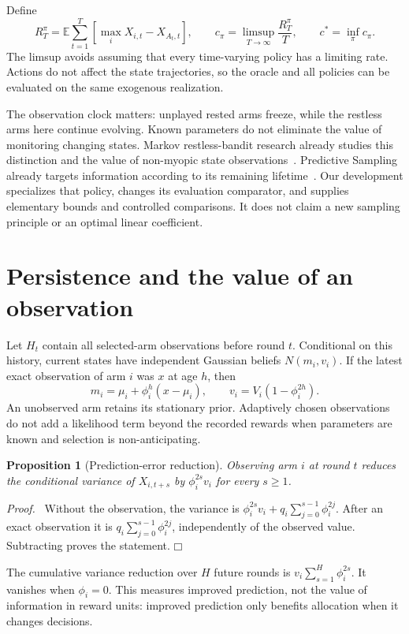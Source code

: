 \documentclass[11pt]{article}
\newtheorem{proposition}{Proposition}
\newenvironment{proof}{\par\noindent\textit{Proof.}\ }{\hfill$\mdlgwhtsquare$\par\medskip}
\newcommand{\E}{\mathbb E}
\begin{document}
Define
\begin{equation}
R_T^\pi=\E\sum_{t=1}^T[\max_iX_{i,t}-X_{A_t,t}],\qquad
c_\pi=\limsup_{T\to\infty}\frac{R_T^\pi}{T},\qquad
c^*=\inf_\pi c_\pi.
\end{equation}
The limsup avoids assuming that every time-varying policy has a limiting rate. Actions do not affect the state trajectories, so the oracle and all policies can be evaluated on the same exogenous realization.

The observation clock matters: unplayed rested arms freeze, while the restless arms here continue evolving. Known parameters do not eliminate the value of monitoring changing states. Markov restless-bandit research already studies this distinction and the value of non-myopic state observations~\cite{ortner2014}. Predictive Sampling already targets information according to its remaining lifetime~\cite{liu2023}. Our development specializes that policy, changes its evaluation comparator, and supplies elementary bounds and controlled comparisons. It does not claim a new sampling principle or an optimal linear coefficient.

\section{Persistence and the value of an observation}
Let $H_t$ contain all selected-arm observations before round $t$. Conditional on this history, current states have independent Gaussian beliefs $N(m_i,v_i)$. If the latest exact observation of arm $i$ was $x$ at age $h$, then
\begin{equation}
m_i=\mu_i+\phi_i^h(x-\mu_i),\qquad
v_i=V_i(1-\phi_i^{2h}).
\label{eq:belief}
\end{equation}
An unobserved arm retains its stationary prior. Adaptively chosen observations do not add a likelihood term beyond the recorded rewards when parameters are known and selection is non-anticipating.

\begin{proposition}[Prediction-error reduction]
Observing arm $i$ at round $t$ reduces the conditional variance of $X_{i,t+s}$ by $\phi_i^{2s}v_i$ for every $s\geq1$.
\end{proposition}
\begin{proof}
Without the observation, the variance is
$\phi_i^{2s}v_i+q_i\sum_{j=0}^{s-1}\phi_i^{2j}$.
After an exact observation it is $q_i\sum_{j=0}^{s-1}\phi_i^{2j}$, independently of the observed value. Subtracting proves the statement.
\end{proof}
The cumulative variance reduction over $H$ future rounds is $v_i\sum_{s=1}^H\phi_i^{2s}$. It vanishes when $\phi_i=0$. This measures improved prediction, not the value of information in reward units: improved prediction only benefits allocation when it changes decisions.
\end{document}
